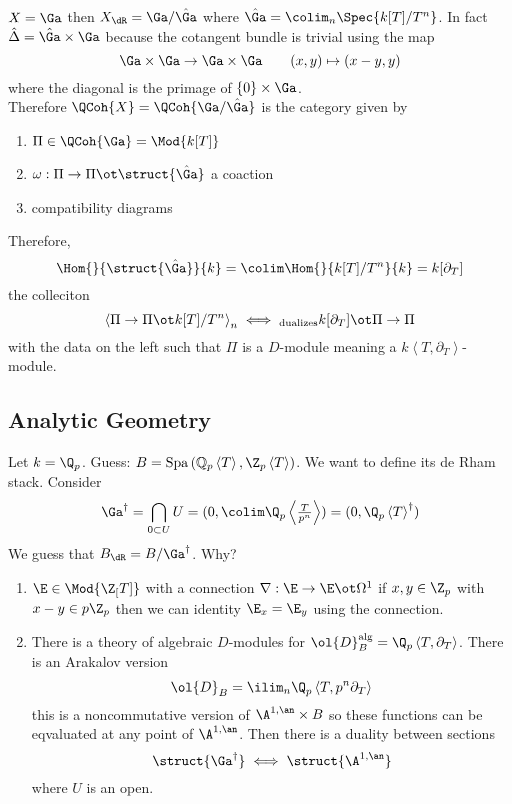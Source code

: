 \documentclass[12pt]{article}
\begin{document}
\begin{example}
$X = \Ga$ then $X_{\dR} = \Ga / \hat{\Ga}$ where $\hat{\Ga} = \colim_n \Spec{k[T]/T^n}$.  In fact $\hat{\Delta} = \hat{\Ga} \times \Ga$ because the cotangent bundle is trivial using the map
\[ \Ga \times \Ga \to \Ga \times \Ga \quad \quad (x, y) \mapsto (x - y, y) \]
where the diagonal is the primage of $\{ 0 \} \times \Ga$. 
\bigskip\\
Therefore $\QCoh{X} = \QCoh{\Ga / \hat{\Ga}}$ is the category given by
\begin{enumerate}
\item $\Pi \in \QCoh{\Ga} = \Mod{k[T]}$
\item $\omega : \Pi \to \Pi \ot \struct{\hat{\Ga}}$ a coaction
\item compatibility diagrams
\end{enumerate}
Therefore,
\[ \Hom{}{\struct{\hat{\Ga}}}{k} = \colim \Hom{}{k[T]/T^n}{k} = k[\partial_T] \] 
the colleciton
\[ \left< \Pi \to \Pi \ot k[T] / T^n \right>_n \iff_{\text{dualizes}} k[\partial_T] \ot \Pi \to \Pi \]
with the data on the left such that $\Pi$ is a $D$-module meaning a $k\left<T, \partial_T\right>$-module.
\end{example}

\subsection{Analytic Geometry}

\newcommand{\Spa}[1]{\mathrm{Spa}\left( #1 \right)}
\newcommand{\Qp}{\mathbb{Q}_p}
\newcommand{\alg}{\mathrm{alg}}

Let $k = \Q_p$. Guess: $B = \Spa{\Qp\left< T \right>, \Z_p \left< T \right>}$. We want to define its de Rham stack. Consider
\[ \Ga^\dagger = \bigcap_{0 \subset U} U = (0, \colim \Q_p \left< \tfrac{T}{p^n} \right>) = (0, \Q_p \left< T \right>^\dagger) \]
We guess that $B_{\dR} = B / \Ga^\dagger$. Why? 
\begin{enumerate}
\item $\E \in \Mod{\Z_[T]}$ with a connection $\nabla : \E \to \E \ot \Omega^1$ if $x,y \in \Z_p$ with $x-y \in p \Z_p$ then we can identity $\E_x = \E_y$ using the connection. 
\item There is a theory of algebraic $D$-modules for $\ol{D}^\alg_B = \Q_p \left< T, \partial_T \right>$. There is an Arakalov version
\[ \ol{D}_B = \ilim_n \Q_p \left< T, p^n \partial_T \right> \]
this is a noncommutative version of $\A^{1, \an} \times B$ so these functions can be eqvaluated at any point of $\A^{1, \an}$. Then there is a duality between sections
\[ \struct{\Ga^\dagger} \iff \struct{\A^{1, \an}} \]  
where $U$ is an open. 
\end{enumerate}
\end{document}
